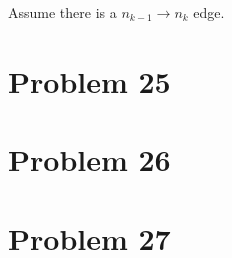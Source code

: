 \documentclass[12pt]{article}
\begin{document}
Assume there is a $n_{k-1} \to n_k$ edge.

\section{Problem 25}

\section{Problem 26}

\section{Problem 27}
\end{document}
